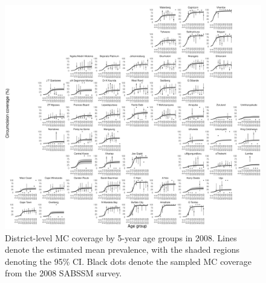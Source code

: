\documentclass{article}
\begin{document}
\begin{appendix}

\begin{figure}[H]
	\centering
	\includegraphics[width = \linewidth]{Figures/suppmat/ModelFit/TotalPrev_5year_District_2008_withsurveypoints}
	\caption{District-level MC coverage by 5-year age groups in 2008. Lines denote the estimated mean prevalence, with the shaded regions denoting the 95\% CI. Black dots denote the sampled MC coverage from the 2008 SABSSM survey.}
\end{figure}



\end{appendix}
\end{document}
